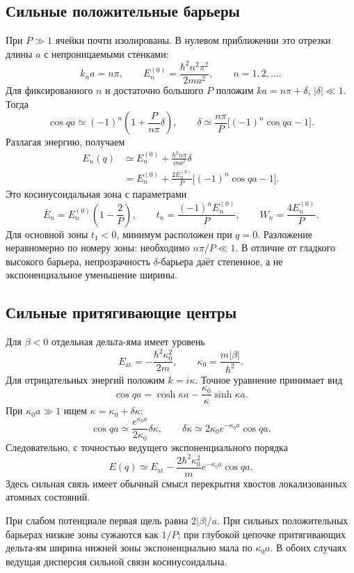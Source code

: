\documentclass[../final.tex]{subfiles}
\begin{document}
\subsection*{Сильные положительные барьеры}

При $P\gg1$ ячейки почти изолированы. В нулевом приближении
это отрезки длины $a$ с непроницаемыми стенками:
\[
    k_na=n\pi,\qquad E_n^{(0)}=\frac{\hbar^2n^2\pi^2}{2ma^2},
    \qquad n=1,2,\ldots.
\]
Для фиксированного $n$ и достаточно большого $P$ положим
$ka=n\pi+\delta$, $|\delta|\ll1$. Тогда
\[
    \cos qa\simeq(-1)^n\left(1+\frac P{n\pi}\delta\right),
    \qquad
    \delta\simeq\frac{n\pi}{P}\bigl[(-1)^n\cos qa-1\bigr].
\]
Разлагая энергию, получаем
\begin{align*}
    E_n(q)&\simeq E_n^{(0)}+\frac{\hbar^2n\pi}{ma^2}\delta\\
       &=E_n^{(0)}+\frac{2E_n^{(0)}}P
          \bigl[(-1)^n\cos qa-1\bigr].
\end{align*}
Это косинусоидальная зона с параметрами
\[
    \bar E_n=E_n^{(0)}\left(1-\frac2P\right),\qquad
    t_n=\frac{(-1)^n E_n^{(0)}}P,\qquad
    W_n=\frac{4E_n^{(0)}}P.
\]
Для основной зоны $t_1<0$, минимум расположен при $q=0$.
Разложение неравномерно по номеру зоны: необходимо $n\pi/P\ll1$.
В отличие от гладкого высокого барьера, непрозрачность
$\delta$-барьера даёт степенное, а не экспоненциальное уменьшение ширины.

\subsection*{Сильные притягивающие центры}

Для $\beta<0$ отдельная дельта-яма имеет уровень
\[
    E_{\mathrm{at}}=-\frac{\hbar^2\kappa_0^2}{2m},\qquad
    \kappa_0=\frac{m|\beta|}{\hbar^2}.
\]
Для отрицательных энергий положим $k=i\kappa$. Точное уравнение принимает вид
\[
    \cos qa=\cosh\kappa a-\frac{\kappa_0}{\kappa}\sinh\kappa a.
\]
При $\kappa_0a\gg1$ ищем $\kappa=\kappa_0+\delta\kappa$:
\[
    \cos qa\simeq\frac{e^{\kappa_0a}}{2\kappa_0}\delta\kappa,
    \qquad
    \delta\kappa\simeq2\kappa_0e^{-\kappa_0a}\cos qa.
\]
Следовательно, с точностью ведущего экспоненциального порядка
\[
    E(q)\simeq E_{\mathrm{at}}
       -\frac{2\hbar^2\kappa_0^2}{m}e^{-\kappa_0a}\cos qa.
\]
Здесь сильная связь имеет обычный смысл перекрытия хвостов
локализованных атомных состояний.

\answer
При слабом потенциале первая щель равна $2|\beta|/a$.
При сильных положительных барьерах низкие зоны сужаются как $1/P$;
при глубокой цепочке притягивающих дельта-ям ширина нижней зоны
экспоненциально мала по $\kappa_0a$. В обоих случаях ведущая
дисперсия сильной связи косинусоидальна.
\endgroup
\end{document}
